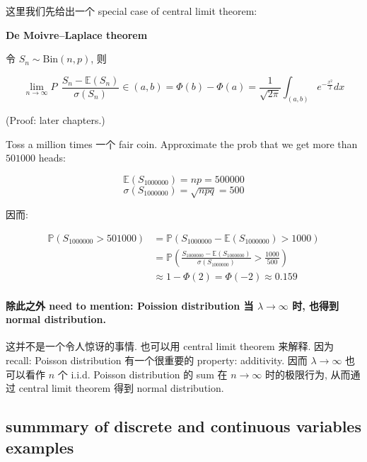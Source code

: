 \documentclass{qlnotes-export}
\begin{document}
这里我们先给出一个 special case of central limit theorem:

\begin{theorem}{\protect{}\label{kn-de-moivre-laplace-theorem}{\textbf{De
Moivre--Laplace theorem}}}

令 \(S_{n} \sim \text{Bin}(n,p)\), 则

\[\lim\limits_{n\rightarrow\infty}P\ \ \frac{S_{n} - {\mathbb{E}}(S_{n})}{\sigma(S_{n})} \in (a,b) = \Phi(b) - \Phi(a) = \frac{1}{\sqrt{2\pi}}\int_{(a,b)}e^{- \frac{x^{2}}{2}} dx\]

\end{theorem}

(Proof: later chapters.)

\begin{example}

Toss a million times 一个 fair coin. Approximate the prob that we get more than \(501000\) heads:

\[{\mathbb{E}}(S_{1000000}) = np = 500000\]\[\sigma(S_{1000000}) = \sqrt{npq} = 500\]

因而:

\[\begin{matrix}
{{\mathbb{P}}(S_{1000000} > 501000)} & {= {\mathbb{P}}(S_{1000000} - {\mathbb{E}}(S_{1000000}) > 1000)} \\
 & {= {\mathbb{P}}\left( {\frac{S_{1000000} - {\mathbb{E}}(S_{1000000})}{\sigma(S_{1000000})} > \frac{1000}{500}} \right)} \\
 & {\approx 1 - \Phi(2) = \Phi( - 2) \approx 0.159}
\end{matrix}\]

\end{example}

\paragraph{\texorpdfstring{除此之外 need to mention: Poission distribution 当 \(\lambda\rightarrow\infty\) 时, 也得到 normal distribution.\\
}{除此之外 need to mention: Poission distribution 当 \textbackslash lambda\textbackslash rightarrow\textbackslash infty 时, 也得到 normal distribution. }}\label{ux9664ux6b64ux4e4bux5916-need-to-mention-poission-distribution-ux5f53-lambdarightarrowinfty-ux65f6-ux4e5fux5f97ux5230-normal-distribution.}

这并不是一个令人惊讶的事情. 也可以用 central limit theorem 来解释. 因为 recall: Poisson distribution 有一个很重要的 property: additivity. 因而 \(\lambda\rightarrow\infty\) 也可以看作 \(n\) 个 i.i.d. Poisson distribution 的 sum 在 \(n\rightarrow\infty\) 时的极限行为, 从而通过 central limit theorem 得到 normal distribution.

\subsection{summmary of discrete and continuous variables examples}\label{summmary-of-discrete-and-continuous-variables-examples}

\begin{center}

\end{center}
\end{document}
